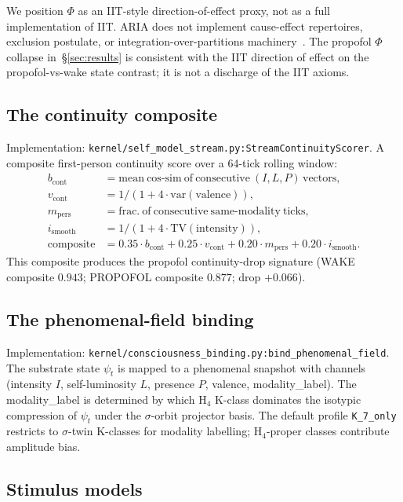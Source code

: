We position $\Phi$ as an IIT-style direction-of-effect proxy, not as
a full implementation of IIT. ARIA does not implement cause-effect
repertoires, exclusion postulate, or integration-over-partitions
machinery~\citep{Tononi2008,BalduzziTononi2008}. The propofol $\Phi$
collapse in~\S\ref{sec:results} is consistent with the IIT direction
of effect on the propofol-vs-wake state contrast; it is not a
discharge of the IIT axioms.

\subsection{The continuity composite}

Implementation:
\texttt{kernel/self\_model\_stream.py:StreamContinuityScorer}.
A composite first-person continuity score over a 64-tick rolling
window:
\begin{align*}
b_{\mathrm{cont}} &= \mathrm{mean\ cos\text{-}sim\ of\ consecutive}\ (I, L, P)\,\mathrm{vectors},\\
v_{\mathrm{cont}} &= 1/(1 + 4\cdot \mathrm{var}(\mathrm{valence})),\\
m_{\mathrm{pers}} &= \mathrm{frac.\ of\ consecutive\ same\text{-}modality\ ticks},\\
i_{\mathrm{smooth}} &= 1/(1 + 4\cdot \mathrm{TV}(\mathrm{intensity})),\\
\mathrm{composite} &= 0.35\cdot b_{\mathrm{cont}} + 0.25\cdot v_{\mathrm{cont}} + 0.20\cdot m_{\mathrm{pers}} + 0.20\cdot i_{\mathrm{smooth}}.
\end{align*}
This composite produces the propofol continuity-drop signature
(WAKE composite $0.943$; PROPOFOL composite $0.877$;
drop $+0.066$).

\subsection{The phenomenal-field binding}

Implementation:
\texttt{kernel/consciousness\_binding.py:bind\_phenomenal\_field}.
The substrate state $\psi_{t}$ is mapped to a phenomenal snapshot
with channels (intensity $I$, self-luminosity $L$, presence $P$,
valence, modality\_label). The modality\_label is determined by which
H$_4$ K-class dominates the isotypic compression of $\psi_{t}$ under
the $\sigma$-orbit projector basis. The default profile
\texttt{K\_7\_only} restricts to $\sigma$-twin K-classes for modality
labelling; H$_4$-proper classes contribute amplitude bias.

\subsection{Stimulus models}

